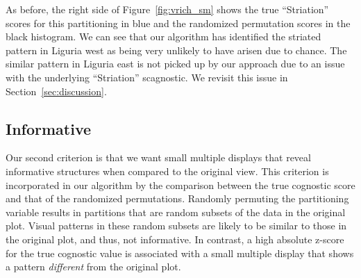 As before, the right side of Figure~\ref{fig:vrich_sm} shows the true ``Striation'' scores for this partitioning in blue and the randomized permutation scores in the black histogram. We can see that our algorithm has identified the striated pattern in Liguria west as being very unlikely to have arisen due to chance. The similar pattern in Liguria east is not picked up by our approach due to an issue with the underlying ``Striation'' scagnostic. We revisit this issue in Section~\ref{sec:discussion}.

\subsection{Informative}
Our second criterion is that we want small multiple displays that reveal informative structures when compared to the original view. This criterion is incorporated in our algorithm by the comparison between the true cognostic score and that of the randomized permutations. Randomly permuting the partitioning variable results in partitions that are random subsets of the data in the original plot. Visual patterns in these random subsets are likely to be similar to those in the original plot, and thus, not informative. In contrast, a high absolute z-score for the true cognostic value is associated with a small multiple display that shows a pattern \emph{different} from the original plot.

